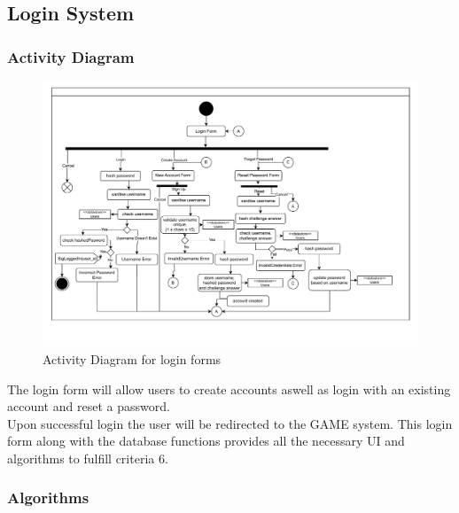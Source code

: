 \documentclass{article}
\begin{document}
        \subsection{Login System}
        \subsubsection{Activity Diagram}
        \begin{figure}[H]
                \centering
                \includegraphics[width=\textwidth, trim = 0 50 0 0, clip]{images/design/Login_System.pdf}
                \caption{Activity Diagram for login forms}
                
        \end{figure}
        The login form will allow users to create accounts aswell as login with an existing account and reset a password.\\
        Upon successful login the user will be redirected to the GAME system. This login form along with the database functions provides all the necessary UI and algorithms to fulfill criteria 6.\\
        \subsubsection{Algorithms}
\end{document}
